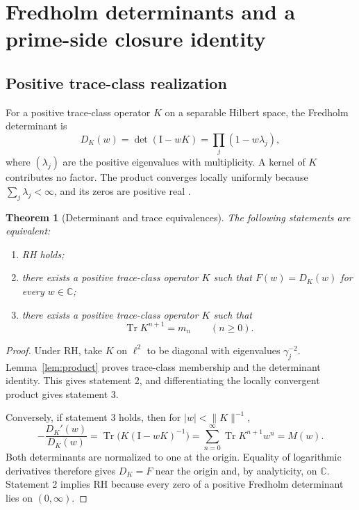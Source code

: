 \documentclass[11pt,letterpaper]{article}
\numberwithin{equation}{section}
\newtheorem{theorem}{Theorem}[section]
\theoremstyle{definition}
\theoremstyle{remark}
\newcommand{\C}{\mathbb C}
\newcommand{\Id}{\mathrm I}
\DeclareMathOperator{\Tr}{Tr}
\begin{document}
\section{Fredholm determinants and a prime-side closure identity}
\label{sec:trace}
\subsection{Positive trace-class realization}
For a positive trace-class operator $K$ on a separable Hilbert space, the Fredholm determinant is
\begin{equation}
 D_K(w)=\det(\Id-wK)=\prod_j(1-w\lambda_j),
 \label{eq:fredholm}
\end{equation}
where $(\lambda_j)$ are the positive eigenvalues with multiplicity. A kernel of $K$ contributes no factor. The product converges locally uniformly because $\sum_j\lambda_j<\infty$, and its zeros are positive real \cite{simon}.

\begin{theorem}[Determinant and trace equivalences]
\label{thm:determinant}
The following statements are equivalent:
\begin{enumerate}
 \item RH holds;
 \item there exists a positive trace-class operator $K$ such that $F(w)=D_K(w)$ for every $w\in\C$;
 \item there exists a positive trace-class operator $K$ such that
 \begin{equation}
   \Tr K^{n+1}=m_n\qquad(n\geq0).
   \label{eq:tracemoments}
 \end{equation}
\end{enumerate}
\end{theorem}
\begin{proof}
Under RH, take $K$ on $\ell^2$ to be diagonal with eigenvalues $\gamma_j^{-2}$. Lemma~\ref{lem:product} proves trace-class membership and the determinant identity. This gives statement 2, and differentiating the locally convergent product gives statement 3.

Conversely, if statement 3 holds, then for $|w|<\|K\|^{-1}$,
\begin{equation}
 -\frac{D_K'(w)}{D_K(w)}
 =\Tr\bigl(K(\Id-wK)^{-1}\bigr)
 =\sum_{n=0}^{\infty}\Tr K^{n+1}w^n=M(w).
 \label{eq:logdet}
\end{equation}
Both determinants are normalized to one at the origin. Equality of logarithmic derivatives therefore gives $D_K=F$ near the origin and, by analyticity, on $\C$. Statement 2 implies RH because every zero of a positive Fredholm determinant lies on $(0,\infty)$.
\end{proof}
\end{document}
